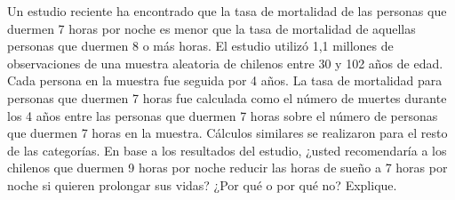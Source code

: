 \documentclass[letterpaper,11pt]{article}
\begin{document}
Un estudio reciente ha encontrado que la tasa de mortalidad de las personas que duermen 7 horas
por noche es menor que la tasa de mortalidad de aquellas personas que duermen 8 o más horas. El
estudio utilizó 1,1 millones de observaciones de una muestra aleatoria de chilenos entre 30 y
102 años de edad. Cada persona en la muestra fue seguida por 4 años. La tasa de mortalidad para
personas que duermen 7 horas fue calculada como el número de muertes durante los 4 años entre
las personas que duermen 7 horas sobre el número de personas que duermen 7 horas en la muestra.
Cálculos similares se realizaron para el resto de las categorías. En base a los resultados del
estudio, ¿usted recomendaría a los chilenos que duermen 9 horas por noche reducir las horas de
sueño a 7 horas por noche si quieren prolongar sus vidas? ¿Por qué o por qué no? Explique.
\end{document}
